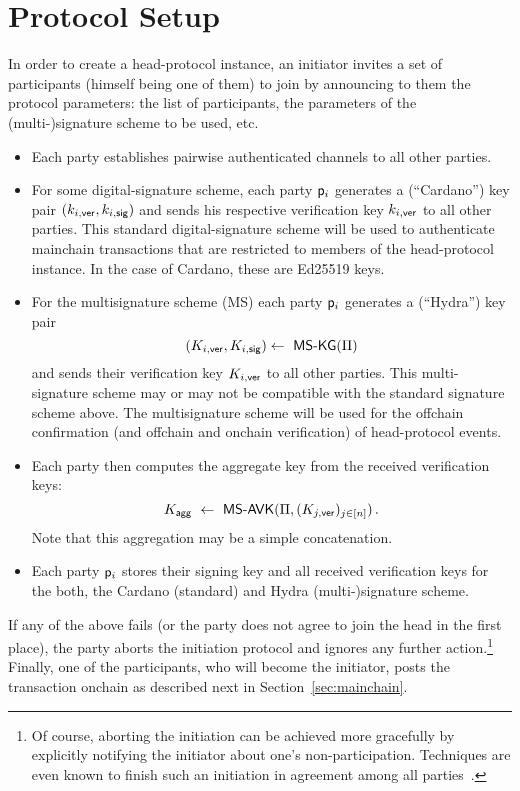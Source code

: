 
\section{Protocol Setup}\label{sec:hpsetup}
In order to create a head-protocol instance, an initiator invites a set of
participants (himself being one of them) to join by announcing to them the
protocol parameters: the list of participants, the parameters of the
(multi-)signature scheme to be used, etc.

\begin{itemize}
  \item Each party establishes pairwise authenticated channels to all other
        parties.

  \item For some digital-signature scheme, each party $\mathsf p_i$ generates a
        (``Cardano'') key pair $(k_{i,\mathsf{ver}},k_{i,\mathsf{sig}})$ and sends his respective
        verification key $k_{i,\mathsf{ver}}$ to all other parties. This standard
        digital-signature scheme will be used to authenticate mainchain
        transactions that are restricted to members of the head-protocol
        instance. In the case of Cardano, these are Ed25519 keys.

  \item For the multisignature scheme (MS) 
        each party $\mathsf p_i$ generates a (``Hydra'') key pair
        \[
          (\daPuI{i},\daPrI{i})  \gets \ \msKeyGen(\msParams)
        \]
        and sends their verification key $K_{i,\mathsf{ver}}$ to all other parties. This
        multi-signature scheme may or may not be compatible with the standard
        signature scheme above. The multisignature scheme will be used for the
        offchain confirmation (and offchain and onchain verification) of
        head-protocol events.

  \item Each party then computes the aggregate key from the received
        verification keys:
        \[
          \hpAK \ \gets \ \msCombVK(\msParams,(\daPuI{j})_{j\in[n]}) \,.
        \]
        Note that this aggregation may be a simple concatenation.

  \item Each party $\mathsf p_i$ stores their signing key and all received
        verification keys for the both, the Cardano (standard) and Hydra
        (multi-)signature scheme.
\end{itemize}

If any of the above fails (or the party does not agree to join the head in the
first place), the party aborts the initiation protocol and ignores any further
action.\footnote{Of course, aborting the initiation can be achieved more
  gracefully by explicitly notifying the initiator about one's
  non-participation. Techniques are even known to finish such an initiation in
  agreement among all parties~\cite{PODC:FGHHS02}.} Finally, one of the
participants, who will become the initiator, posts the \mtxInit{} transaction
onchain as described next in Section~\ref{sec:mainchain}.


